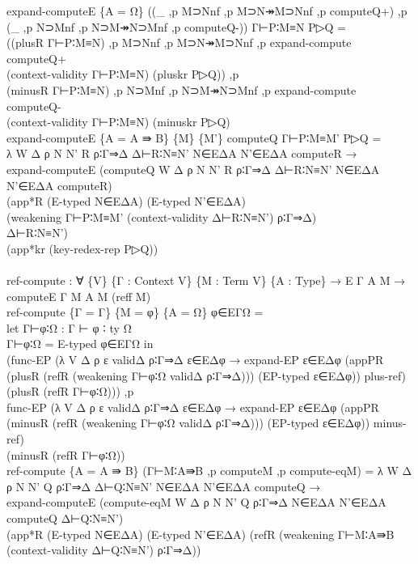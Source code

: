 {\begin{code}
{\>expand-computeE \{A = Ω\} ((\_ ,p M⊃Nnf ,p M⊃N↠M⊃Nnf ,p computeQ+) ,p (\_ ,p N⊃Mnf ,p N⊃M↠N⊃Mnf ,p computeQ-)) Γ⊢P∶M≡N P▷Q = \<\\
\>  ((plusR Γ⊢P∶M≡N) ,p M⊃Nnf ,p M⊃N↠M⊃Nnf ,p expand-compute computeQ+ \<\\
\>    (context-validity Γ⊢P∶M≡N) (pluskr P▷Q)) ,p \<\\
\>  (minusR Γ⊢P∶M≡N) ,p N⊃Mnf ,p N⊃M↠N⊃Mnf ,p expand-compute computeQ- \<\\
\>    (context-validity Γ⊢P∶M≡N) (minuskr P▷Q)\<\\
\>expand-computeE \{A = A ⇛ B\} \{M\} \{M'\} computeQ Γ⊢P∶M≡M' P▷Q = \<\\
\>  λ W Δ ρ N N' R ρ∶Γ⇒Δ Δ⊢R∶N≡N' N∈EΔA N'∈EΔA computeR → \<\\
\>  expand-computeE (computeQ W Δ ρ N N' R ρ∶Γ⇒Δ Δ⊢R∶N≡N' N∈EΔA N'∈EΔA computeR) \<\\
\>  (app*R (E-typed N∈EΔA) (E-typed N'∈EΔA) \<\\
\>    (weakening Γ⊢P∶M≡M' (context-validity Δ⊢R∶N≡N') ρ∶Γ⇒Δ)\<\\
\>    Δ⊢R∶N≡N')\<\\
\>  (app*kr (key-redex-rep P▷Q))\<\\
\>\<\\
\>ref-compute : ∀ \{V\} \{Γ : Context V\} \{M : Term V\} \{A : Type\} → E Γ A M → computeE Γ M A M (reff M)\<\\
\>ref-compute \{Γ = Γ\} \{M = φ\} \{A = Ω\} φ∈EΓΩ = \<\\
\>  let Γ⊢φ∶Ω : Γ ⊢ φ ∶ ty Ω\<\\
\>      Γ⊢φ∶Ω = E-typed φ∈EΓΩ in\<\\
\>  (func-EP (λ V Δ ρ ε validΔ ρ∶Γ⇒Δ ε∈EΔφ → expand-EP ε∈EΔφ (appPR (plusR (refR (weakening Γ⊢φ∶Ω validΔ ρ∶Γ⇒Δ))) (EP-typed ε∈EΔφ)) plus-ref) \<\\
\>  (plusR (refR Γ⊢φ∶Ω))) ,p \<\\
\>  func-EP (λ V Δ ρ ε validΔ ρ∶Γ⇒Δ ε∈EΔφ → expand-EP ε∈EΔφ (appPR (minusR (refR (weakening Γ⊢φ∶Ω validΔ ρ∶Γ⇒Δ))) (EP-typed ε∈EΔφ)) minus-ref) \<\\
\>  (minusR (refR Γ⊢φ∶Ω))\<\\
\>ref-compute \{A = A ⇛ B\} (Γ⊢M∶A⇛B ,p computeM ,p compute-eqM) = λ W Δ ρ N N' Q ρ∶Γ⇒Δ Δ⊢Q∶N≡N' N∈EΔA N'∈EΔA computeQ → \<\\
\>  expand-computeE (compute-eqM W Δ ρ N N' Q ρ∶Γ⇒Δ N∈EΔA N'∈EΔA computeQ Δ⊢Q∶N≡N') \<\\
\>    (app*R (E-typed N∈EΔA) (E-typed N'∈EΔA) (refR (weakening Γ⊢M∶A⇛B (context-validity Δ⊢Q∶N≡N') ρ∶Γ⇒Δ)) \<\\
}
\end{code}}
